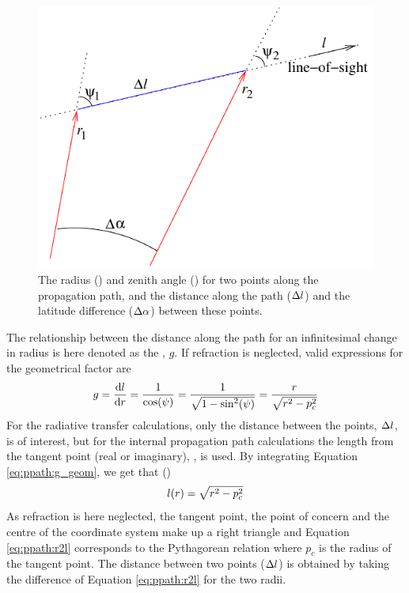 \begin{figure}
 \begin{center}
  \begin{minipage}[c]{0.65\textwidth}
   \begin{center}
    \includegraphics*[width=0.9\hsize]{geom1d}
   \end{center}
  \end{minipage}%
  \begin{minipage}[c]{0.35\textwidth}
   \caption{The radius (\Rds) and zenith angle (\ZntAng) for two points along
     the propagation path, and the distance along the path ($\Delta l$)
     and the latitude difference ($\Delta\alpha$) between these points.}
   \label{fig:ppath:1d2dgeom}
  \end{minipage}
 \end{center}
\end{figure}   

The relationship between the distance along the path for an
infinitesimal change in radius is here denoted as the
, $g$. If refraction is neglected, valid
expressions for the geometrical factor are
\begin{equation}
  g = \frac{\mathrm{d} l}{\mathrm{d} r} 
           = \frac{1}{\cos(\psi)} = \frac{1}{\sqrt{1-\sin^2(\psi)}}
                                            = \frac{r}{\sqrt{r^2-p_c^2}}
  \label{eq:ppath:g_geom}
\end{equation}
For the radiative transfer calculations, only the distance between the
points, $\Delta l$, is of interest, but for the internal
propagation path calculations the length from the tangent point (real
or imaginary), \PpathLng, is used. By integrating
Equation \ref{eq:ppath:g_geom}, we get that
()
\begin{equation}
  l(r) = \sqrt{r^2-p_c^2} 
  \label{eq:ppath:r2l}
\end{equation}
As refraction is here neglected, the tangent point, the point of
concern and the centre of the coordinate system make up a right
triangle and Equation \ref{eq:ppath:r2l} corresponds to the
Pythagorean relation where $p_c$ is the radius of the tangent point.
The distance between two points ($\Delta l$) is obtained by
taking the difference of Equation \ref{eq:ppath:r2l} for the two
radii.

